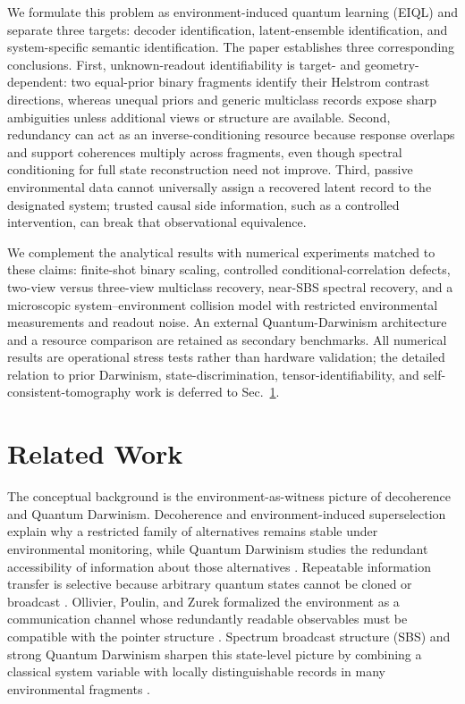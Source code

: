 We formulate this problem as environment-induced quantum learning (EIQL) and separate three targets: decoder identification, latent-ensemble identification, and system-specific semantic identification.  The paper establishes three corresponding conclusions.  First, unknown-readout identifiability is target- and geometry-dependent: two equal-prior binary fragments identify their Helstrom contrast directions, whereas unequal priors and generic multiclass records expose sharp ambiguities unless additional views or structure are available.  Second, redundancy can act as an inverse-conditioning resource because response overlaps and support coherences multiply across fragments, even though spectral conditioning for full state reconstruction need not improve.  Third, passive environmental data cannot universally assign a recovered latent record to the designated system; trusted causal side information, such as a controlled intervention, can break that observational equivalence.

We complement the analytical results with numerical experiments matched to these claims: finite-shot binary scaling, controlled conditional-correlation defects, two-view versus three-view multiclass recovery, near-SBS spectral recovery, and a microscopic system--environment collision model with restricted environmental measurements and readout noise.  An external Quantum-Darwinism architecture and a resource comparison are retained as secondary benchmarks.  All numerical results are operational stress tests rather than hardware validation; the detailed relation to prior Darwinism, state-discrimination, tensor-identifiability, and self-consistent-tomography work is deferred to Sec.~\ref{sec:related}.

\section{Related Work}
\label{sec:related}

The conceptual background is the environment-as-witness picture of decoherence and Quantum Darwinism.  Decoherence and environment-induced superselection explain why a restricted family of alternatives remains stable under environmental monitoring, while Quantum Darwinism studies the redundant accessibility of information about those alternatives \cite{zurek2003,zurek2009,zurek2022,zurek2025book}.  Repeatable information transfer is selective because arbitrary quantum states cannot be cloned or broadcast \cite{wootters1982,barnum1996}.  Ollivier, Poulin, and Zurek formalized the environment as a communication channel whose redundantly readable observables must be compatible with the pointer structure \cite{ollivier2004,ollivier2005}.  Spectrum broadcast structure (SBS) and strong Quantum Darwinism sharpen this state-level picture by combining a classical system variable with locally distinguishable records in many environmental fragments \cite{korbicz2014,horodecki2015,le2019,korbicz2021}.

